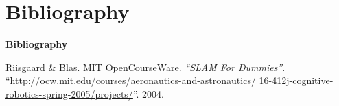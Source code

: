 \documentclass[xcolor=dvipsnames]{beamer}
\begin{document}
  \section{Bibliography}
  \begin{frame}{\bf Bibliography}
    \begin{thebibliography}{3}

     Riisgaard \& Blas. MIT OpenCourseWare.
      \newblock \emph{``SLAM For Dummies''}.
      \newblock
      ``\url{http://ocw.mit.edu/courses/aeronautics-and-astronautics/
        16-412j-cognitive-robotics-spring-2005/projects/}''. 2004.
      
    \end{thebibliography}
  \end{frame}
  
\end{document}
